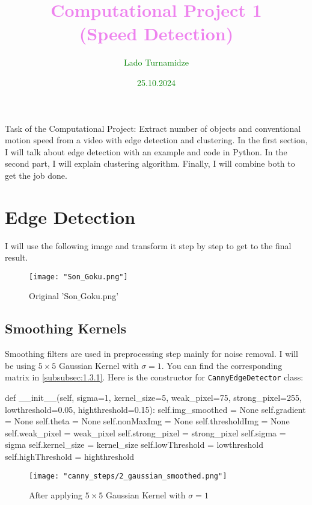 \documentclass{article}
\begin{document}
	\title{\textcolor{violet}{Computational Project 1 \\ (Speed Detection)}}
	\author{\textcolor{green}{Lado Turnamidze}}
	\date{\textcolor{green}{25.10.2024}}
	
	\maketitle
	
	Task of the Computational Project: Extract number of objects and conventional motion speed from a video with edge detection and clustering. In the first section, I will talk about edge detection with an example and code in Python. In the second part, I will explain clustering algorithm. Finally, I will combine both to get the job done.
	
	\section{Edge Detection}
	I will use the following image and transform it step by step to get to the final result. 
	
	\begin{figure}[H]
		\centering
		\texttt{[image: "Son\_Goku.png"]}
		\caption{Original 'Son$\_$Goku.png'}
	\end{figure}

	\subsection{Smoothing Kernels}
	Smoothing filters are used in preprocessing step mainly for noise removal. 
	I will be using $5 \times 5$ Gaussian Kernel with $\sigma = 1$. You can find the corresponding matrix in \ref{subsubsec:1.3.1}. Here is the constructor for \texttt{CannyEdgeDetector} class:
	
	\begin{python}
def __init__(self, sigma=1, kernel_size=5, weak_pixel=75, 
		strong_pixel=255, lowthreshold=0.05, highthreshold=0.15):
	self.img_smoothed = None
	self.gradient = None
	self.theta = None
	self.nonMaxImg = None
	self.thresholdImg = None
	self.weak_pixel = weak_pixel
	self.strong_pixel = strong_pixel
	self.sigma = sigma
	self.kernel_size = kernel_size
	self.lowThreshold = lowthreshold
	self.highThreshold = highthreshold\end{python}
	
	\begin{figure}[H]
		\centering
		\texttt{[image: "canny\_steps/2\_gaussian\_smoothed.png"]}
		\caption{After applying $5 \times 5$ Gaussian Kernel with $\sigma = 1$}
	\end{figure}
	
\end{document}
